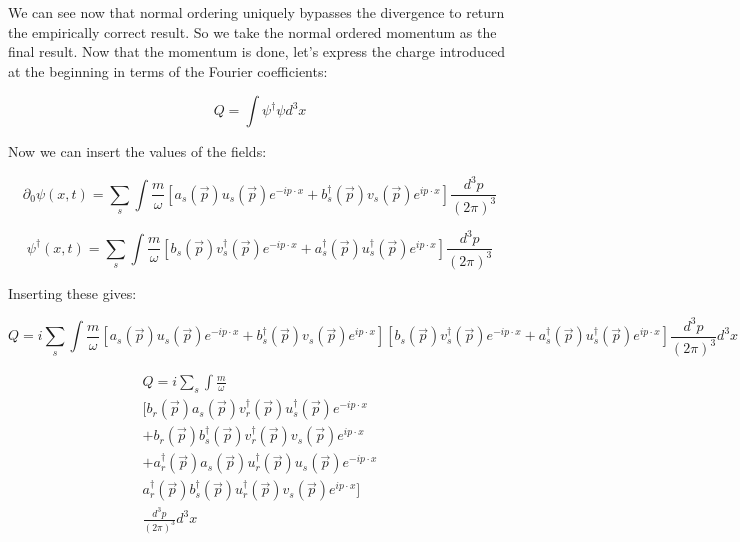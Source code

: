 \documentclass[a4]{article}
\begin{document}
    We can see now that normal ordering uniquely bypasses the divergence to return the empirically correct result. So we take the normal
    ordered momentum as the final result. Now that the momentum is done, let's express the charge introduced at the beginning in terms of
    the Fourier coefficients:

    \begin{equation}
        Q = \int \psi^{\dagger} \psi d^3 x
    \end{equation}

    Now we can insert the values of the fields:

    \begin{equation}
        \partial_{0} \psi (x, t) = \sum_{s} \int \frac{m}{\omega} [a_s (\vec{p}) u_s (\vec{p}) e^{- i p \cdot x} + b_s^{\dagger} (\vec{p}) v_s (\vec{p}) e^{i p \cdot x}] \frac{d^{3} p}{(2 \pi)^3}
    \end{equation}

    \begin{equation}
        \psi^{\dagger} (x, t) = \sum_{s} \int \frac{m}{\omega} [b_s (\vec{p}) v_s^{\dagger} (\vec{p}) e^{- i p \cdot x} + a_s^{\dagger} (\vec{p}) u_s^{\dagger} (\vec{p}) e^{i p \cdot x}] \frac{d^{3} p}{(2 \pi)^3}
    \end{equation}

    Inserting these gives:

    \begin{equation}
        Q = i \sum_{s} \int \frac{m}{\omega} [a_s (\vec{p}) u_s (\vec{p}) e^{- i p \cdot x} + b_s^{\dagger} (\vec{p}) v_s (\vec{p}) e^{i p \cdot x}] [b_s (\vec{p}) v_s^{\dagger} (\vec{p}) e^{- i p \cdot x} + a_s^{\dagger} (\vec{p}) u_s^{\dagger} (\vec{p}) e^{i p \cdot x}] \frac{d^{3} p}{(2 \pi)^3} d^3 x
    \end{equation}


    \begin{equation}
        \begin{aligned}
            Q = i \sum_{s} \int \frac{m}{\omega} \\
        [b_r (\vec{p}) a_s (\vec{p}) v_r^{\dagger} (\vec{p}) u_s^{\dagger} (\vec{p}) e^{- i p \cdot x} \\
        + b_r (\vec{p}) b_s^{\dagger} (\vec{p}) v_r^{\dagger} (\vec{p}) v_s (\vec{p}) e^{i p \cdot x} \\
        + a_r^{\dagger} (\vec{p}) a_s (\vec{p}) u_r^{\dagger} (\vec{p}) u_s (\vec{p}) e^{- i p \cdot x} \\
        a_r^{\dagger} (\vec{p}) b_s^{\dagger} (\vec{p}) u_r^{\dagger} (\vec{p}) v_s (\vec{p}) e^{i p \cdot x}] \\
        \frac{d^{3} p}{(2 \pi)^3} d^3 x
        \end{aligned}
    \end{equation}
\end{document}
